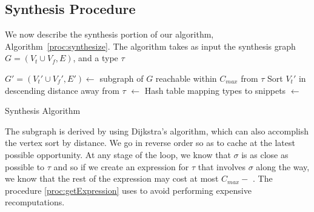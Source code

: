 \subsection{Synthesis Procedure}
\label{sec:algorithm:synthesis}
We now describe the synthesis portion of our algorithm, Algorithm~\ref{proc:synthesize}. The algorithm takes as input the synthesis graph $G=(V_t \cup V_f, E)$, and a type $\tau$

\begin{algorithm}
\BlankLine
$G'=(V_t'\cup V_f', E') \longleftarrow$ subgraph of $G$ reachable within $C_{max}$ from $\tau$ \;
Sort $V_t'$ in descending distance away from $\tau$ \;
\Snips $\longleftarrow$ Hash table mapping types to snippets \;
\Exprs $\longleftarrow$ \Snips[$\tau$] \;
\caption{Synthesis Algorithm}\label{proc:synthesize}
\end{algorithm}

The subgraph is derived by using Dijkstra's algorithm, which can also
accomplish the vertex sort by distance. We go in reverse order so as
to cache at the latest possible opportunity. At any stage of the loop,
we know that $\sigma$ is as close as possible to $\tau$ and so if we
create an expression for $\tau$ that involves $\sigma$ along the way,
we know that the rest of the expression may cost at most $C_{max} - $
\Dist{$\sigma$}. The procedure \ref{proc:getExpression} uses \Snips to
avoid performing expensive recomputations.

